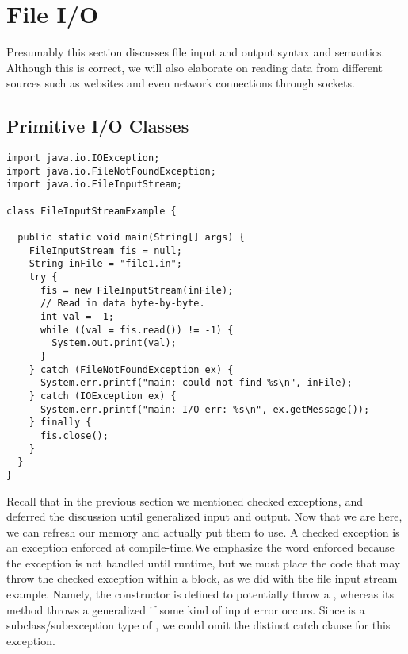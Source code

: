 \section{File I/O}

Presumably this section discusses file input and output syntax and semantics. Although this is correct, we will also elaborate on reading data from different sources such as websites and even network connections through sockets. 

\subsection{Primitive I/O Classes}


\begin{lstlisting}[language=MyJava]
import java.io.IOException;
import java.io.FileNotFoundException;
import java.io.FileInputStream;

class FileInputStreamExample {

  public static void main(String[] args) {
    FileInputStream fis = null;
    String inFile = "file1.in";
    try {
      fis = new FileInputStream(inFile);
      // Read in data byte-by-byte.
      int val = -1;
      while ((val = fis.read()) != -1) { 
        System.out.print(val); 
      }
    } catch (FileNotFoundException ex) {
      System.err.printf("main: could not find %s\n", inFile);
    } catch (IOException ex) {
      System.err.printf("main: I/O err: %s\n", ex.getMessage());
    } finally {
      fis.close();
    } 
  } 
}
\end{lstlisting}

Recall that in the previous section we mentioned checked exceptions, and deferred the discussion until generalized input and output. Now that we are here, we can refresh our memory and actually put them to use. A checked exception is an exception enforced at compile-time.We emphasize the word enforced because the exception is not handled until runtime, but we must place the code that may throw the checked exception within a  block, as we did with the file input stream example. Namely, the  constructor is defined to potentially throw a , whereas its  method throws a generalized  if some kind of input error occurs. Since  is a subclass/subexception type of , we could omit the distinct catch clause for this exception. 

